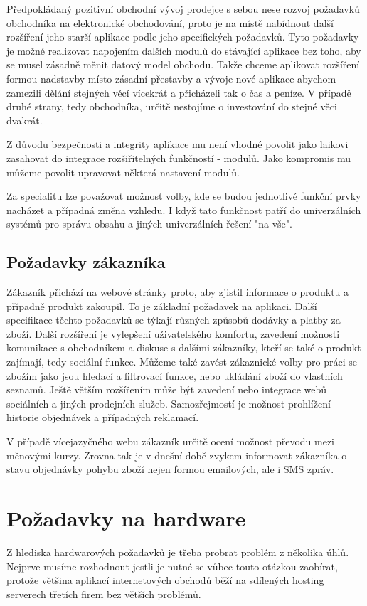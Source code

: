 \documentclass[11pt,twoside,a4paper]{book}
\begin{document}
Předpokládaný pozitivní obchodní vývoj prodejce s sebou nese rozvoj požadavků obchodníka na elektronické obchodování, proto je na místě nabídnout další rozšíření jeho starší aplikace podle jeho specifických požadavků. Tyto požadavky je možné realizovat napojením dalších modulů do stávající aplikace bez toho, aby se musel zásadně měnit datový model obchodu. Takže chceme aplikovat rozšíření formou nadstavby místo zásadní přestavby a vývoje nové aplikace abychom zamezili dělání stejných věcí vícekrát a přicházeli tak o čas a peníze. V případě druhé strany, tedy obchodníka, určitě nestojíme o investování do stejné věci dvakrát.

Z důvodu bezpečnosti a integrity aplikace mu není vhodné povolit jako laikovi zasahovat do integrace rozšiřitelných funkčností - modulů. Jako kompromis mu můžeme povolit upravovat některá nastavení modulů.

Za specialitu lze považovat možnost volby, kde se budou jednotlivé funkční prvky nacházet a případná změna vzhledu. I když tato funkčnost patří do univerzálních systémů pro správu obsahu a jiných univerzálních řešení "na vše".


\subsection{Požadavky zákazníka}
\label{potreby2}

Zákazník přichází na webové stránky proto, aby zjistil informace o produktu a případně produkt zakoupil. To je základní požadavek na aplikaci. Další specifikace těchto požadavků se týkají různých způsobů dodávky a platby za zboží. Další rozšíření je vylepšení uživatelského komfortu, zavedení možnosti komunikace s obchodníkem a diskuse s dalšími zákazníky, kteří se také o produkt zajímají, tedy sociální funkce. Můžeme také zavést zákaznické volby pro práci se zbožím jako jsou hledací a filtrovací funkce, nebo ukládání zboží do vlastních seznamů. Ještě větším rozšířením může být zavedení nebo integrace webů sociálních a jiných prodejních služeb. Samozřejmostí je možnost prohlížení historie objednávek a případných reklamací.

V případě vícejazyčného webu zákazník určitě ocení možnost převodu mezi měnovými kurzy. Zrovna tak je v dnešní době zvykem informovat zákazníka o stavu objednávky pohybu zboží nejen formou emailových, ale i SMS zpráv.


\section{Požadavky na hardware}
Z hlediska hardwarových požadavků je třeba probrat problém z několika úhlů. Nejprve musíme rozhodnout jestli je nutné se vůbec touto otázkou zaobírat, protože většina aplikací internetových obchodů běží na sdílených hosting serverech třetích firem bez větších problémů.
\end{document}
